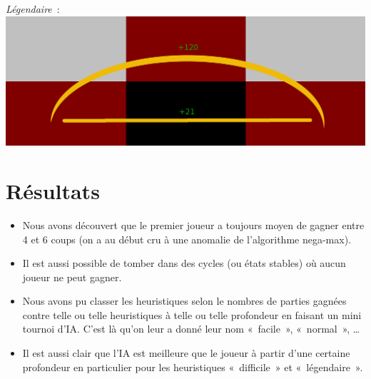 \documentclass[11pt]{beamer}
\begin{document}
\begin{frame}
    \emph{Légendaire} :
    \includegraphics[width=\textwidth]{Heuristic_Legendary}{}
\end{frame}

\section{Résultats}

\begin{frame}
    \begin{itemize}
        \item Nous avons découvert que le premier joueur a toujours moyen de gagner entre 4 et 6 coups
            (on a au début cru à une anomalie de l'algorithme nega-max).
        \item Il est aussi possible de tomber dans des cycles (ou états stables) où aucun joueur ne peut gagner.
        \item Nous avons pu classer les heuristiques selon le nombres de parties gagnées contre telle ou telle heuristiques à
            telle ou telle profondeur en faisant un mini tournoi d'IA\@. C'est là qu'on leur a donné leur nom « facile », « normal », …
        \item Il est aussi clair que l'IA est meilleure que le joueur à partir d'une certaine profondeur en particulier pour les
            heuristiques « difficile » et « légendaire ».
    \end{itemize}
\end{frame}
\end{document}
